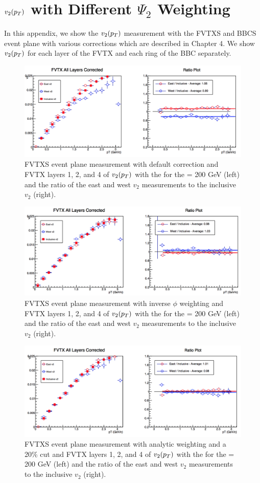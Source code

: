 \chapter{$v_2(\mbox{$p_T$})$ with Different $\Psi_2$ Weighting}	%
\label{sec:appendix}
In this appendix, we show the $v_2(\mbox{$p_T$})$ measurement with the FVTXS and BBCS event plane with various corrections which are described in Chapter 4. We show $v_2(\mbox{$p_T$})$ for each layer of the FVTX and each ring of the BBC separately. 

\begin{figure}[!ht]
\centering
\includegraphics[width=0.65\linewidth]{figs/fvtx_all_default.png}
\caption{FVTXS event plane measurement with default correction and FVTX layers 1, 2, and 4 of $v_{2}(\mbox{$p_T$})$ with the  for the \pau \sqsn = 200 GeV (left) and the ratio of the east and west $v_2$ measurements to the inclusive $v_2$ (right).}
\end{figure}

\begin{figure}[!ht]
\centering
\includegraphics[width=0.65\linewidth]{figs/fvtx_all_data.png}
\caption{FVTXS event plane measurement with inverse $\phi$ weighting and FVTX layers 1, 2, and 4 of $v_{2}(\mbox{$p_T$})$ with the  for the \pau \sqsn = 200 GeV (left) and the ratio of the east and west $v_2$ measurements to the inclusive $v_2$ (right).}
\end{figure}

\begin{figure}[!ht]
\centering
\includegraphics[width=0.65\linewidth]{figs/fvtx_all_analytic.png}
\caption{FVTXS event plane measurement with analytic weighting and a 20\% cut and FVTX layers 1, 2, and 4 of $v_{2}(\mbox{$p_T$})$ with the  for the \pau \sqsn = 200 GeV (left) and the ratio of the east and west $v_2$ measurements to the inclusive $v_2$ (right).}
\end{figure}

